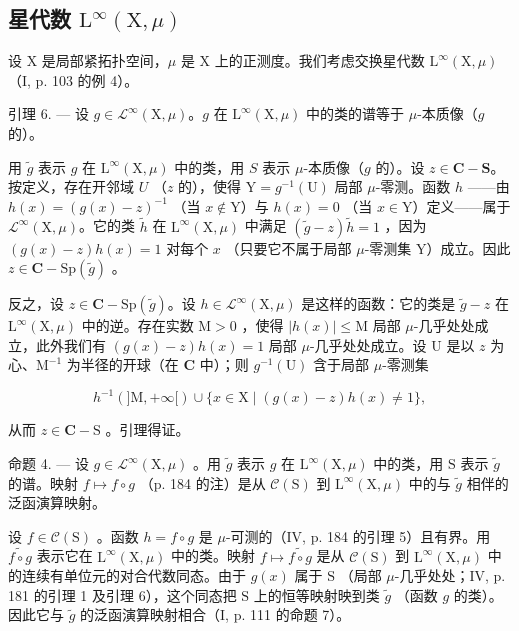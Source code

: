 \subsection{\texorpdfstring{星代数 \(\mathrm{L}^{\infty}(\mathrm{X},\mu)\)}{星代数 \textbackslash mathrm\{L\}\^{}\{\textbackslash infty\}(\textbackslash mathrm\{X\},\textbackslash mu)}}

设 X 是局部紧拓扑空间，\(\mu\) 是 X 上的正测度。我们考虑交换星代数 \(\mathrm{L}^{\infty}(\mathrm{X},\mu)\) （I, p. 103 的例 4）。

引理 6. --- 设 \(g \in \mathcal{L}^{\infty}(\mathrm{X}, \mu)\)。\(g\) 在 \(\mathrm{L}^{\infty}(\mathrm{X}, \mu)\) 中的类的谱等于 \(\mu\)-本质像（\(g\) 的）。

用 \(\widetilde{g}\) 表示 \(g\) 在 \(\mathrm{L}^{\infty}(\mathrm{X},\mu)\) 中的类，用 \(S\) 表示 \(\mu\)-本质像（\(g\) 的）。设 \(z\in \mathbf{C} - \mathbf{S}\)。按定义，存在开邻域 \(U\) （\(z\) 的），使得 \(\mathrm{Y} = g^{-1}(\mathrm{U})\) 局部 \(\mu\)-零测。函数 \(h\) ——由 \(h(x) = (g(x) - z)^{-1}\) （当 \(x\notin \mathrm{Y}\)）与 \(h(x) = 0\) （当 \(x\in \mathrm{Y}\)）定义——属于 \(\mathcal{L}^{\infty}(\mathrm{X},\mu)\)。它的类 \(\widetilde{h}\) 在 \(\mathrm{L}^{\infty}(\mathrm{X},\mu)\) 中满足 \((\widetilde{g} -z)\widetilde{h} = 1\) ，因为 \((g(x) - z)h(x) = 1\) 对每个 \(x\) （只要它不属于局部 \(\mu\)-零测集 Y）成立。因此 \(z\in \mathbf{C} - \mathrm{Sp}(\widetilde{g})\) 。

反之，设 \(z \in \mathbf{C} - \mathrm{Sp}(\widetilde{g})\)。设 \(h \in \mathcal{L}^{\infty}(\mathrm{X},\mu)\) 是这样的函数：它的类是 \(\widetilde{g} - z\) 在 \(\mathrm{L}^{\infty}(\mathrm{X},\mu)\) 中的逆。存在实数 \(\mathrm{M} > 0\) ，使得 \(|h(x)| \leqslant \mathrm{M}\) 局部 \(\mu\)-几乎处处成立，此外我们有 \((g(x) - z)h(x) = 1\) 局部 \(\mu\)-几乎处处成立。设 U 是以 \(z\) 为心、\(\mathrm{M}^{-1}\) 为半径的开球（在 \(\mathbf{C}\) 中）；则 \(g^{-1}(\mathrm{U})\) 含于局部 \(\mu\)-零测集

\[
h ^ { - 1 } ( ] \mathrm{M} , + \infty [ ) \cup \{ x \in \mathrm{X} \mid ( g ( x ) - z ) h ( x ) \neq 1 \} ,
\]

从而 \(z \in \mathbf{C} - \mathrm{S}\) 。引理得证。

命题 4. --- 设 \(g \in \mathcal{L}^{\infty}(\mathrm{X},\mu)\) 。用 \(\widetilde{g}\) 表示 \(g\) 在 \(\mathrm{L}^{\infty}(\mathrm{X},\mu)\) 中的类，用 \(\mathrm{S}\) 表示 \(\widetilde{g}\) 的谱。映射 \(f \mapsto f \circ g\) （p. 184 的注）是从 \(\mathcal{C}(\mathrm{S})\) 到 \(\mathrm{L}^{\infty}(\mathrm{X},\mu)\) 中的与 \(\widetilde{g}\) 相伴的泛函演算映射。

设 \(f \in \mathcal{C}(\mathrm{S})\) 。函数 \(h = f \circ g\) 是 \(\mu\)-可测的（IV, p. 184 的引理 5）且有界。用 \(\widetilde{f \circ g}\) 表示它在 \(\mathrm{L}^{\infty}(\mathrm{X},\mu)\) 中的类。映射 \(f \mapsto \widetilde{f \circ g}\) 是从 \(\mathcal{C}(\mathrm{S})\) 到 \(\mathrm{L}^{\infty}(\mathrm{X},\mu)\) 中的连续有单位元的对合代数同态。由于 \(g(x)\) 属于 \(\mathrm{S}\) （局部 \(\mu\)-几乎处处；IV, p. 181 的引理 1 及引理 6），这个同态把 \(\mathrm{S}\) 上的恒等映射映到类 \(\widetilde{g}\) （函数 \(g\) 的类）。因此它与 \(\widetilde{g}\) 的泛函演算映射相合（I, p. 111 的命题 7）。